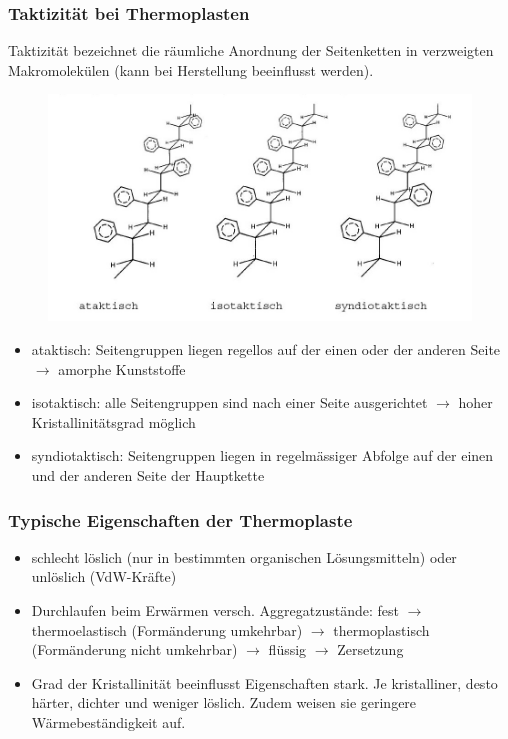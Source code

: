 \subsubsection{Taktizität bei Thermoplasten}
Taktizität bezeichnet die räumliche Anordnung der Seitenketten in verzweigten Makromolekülen (kann bei Herstellung beeinflusst werden).

\begin{figure}[h!]
	\centering
	\includegraphics[width=0.7\linewidth]{images/7_Taktizitaet.png}
\end{figure}

\begin{itemize}
	\item ataktisch: Seitengruppen liegen regellos auf der einen oder der anderen Seite $\rightarrow$ amorphe Kunststoffe
	\item isotaktisch: alle Seitengruppen sind nach einer Seite ausgerichtet $\rightarrow$ hoher Kristallinitätsgrad möglich
	\item syndiotaktisch: Seitengruppen liegen in regelmässiger Abfolge auf der einen und der anderen Seite der Hauptkette
\end{itemize}

\subsubsection{Typische Eigenschaften der Thermoplaste}
\begin{itemize}
	\item schlecht löslich (nur in bestimmten organischen Lösungsmitteln) oder unlöslich (VdW-Kräfte)
	\item Durchlaufen beim Erwärmen versch. Aggregatzustände: fest $\rightarrow$ thermoelastisch (Formänderung umkehrbar) $\rightarrow$ thermoplastisch (Formänderung nicht umkehrbar) $\rightarrow$ flüssig $\rightarrow$ Zersetzung
	\item Grad der Kristallinität beeinflusst Eigenschaften stark. Je kristalliner, desto härter, dichter und weniger löslich. Zudem weisen sie geringere Wärmebeständigkeit auf.
\end{itemize}

